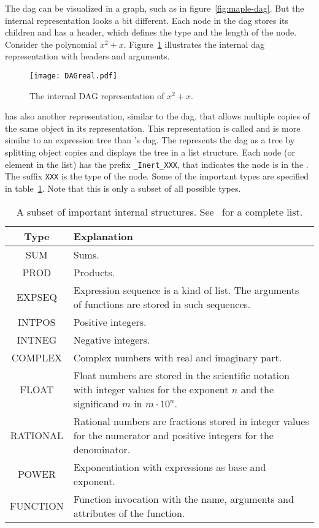 The \Maple{} \gls{dag} can be visualized in a graph, such as in figure~\ref{fig:maple-dag}. But the internal representation looks a bit different. Each node in the \gls{dag} stores its children and has a header, which defines the type and the length of the node. Consider the polynomial $x^2+x$. Figure~\ref{fig:internal-maple-dag} illustrates the internal \gls{dag} representation with headers and arguments.

\begin{figure}[ht]
	\centering
	\texttt{[image: DAGreal.pdf]}
	\caption{The internal \Maple{} DAG representation of $x^2+x$.}
	\label{fig:internal-maple-dag}
\end{figure}

\Maple{} has also another representation, similar to the \gls{dag}, that allows multiple copies of the same object in its representation. This representation is called \inertF{} and is more similar to an expression tree than \Maple's \gls{dag}. The \inertF{} represents the \gls{dag} as a tree by splitting object copies and displays the tree in a list structure. Each node (or element in the list) has the prefix \texttt{\_Inert\_XXX}, that indicates the node is in the \inertF. The suffix \texttt{XXX} is the type of the node. Some of the important types are specified in table~\ref{tab:maple-types}. Note that this is only a subset of all possible types.

\begin{table}[ht]
\centering
\begin{tabular}{cp{10cm}}
	\hline
	Type & Explanation\\
	\hline
	SUM & Sums.\\
	PROD & Products.\\
	EXPSEQ & Expression sequence is a kind of list. The arguments of functions are stored in such sequences.\\
	INTPOS & Positive integers.\\
	INTNEG & Negative integers.\\
	COMPLEX & Complex numbers with real and imaginary part.\\
	FLOAT & Float numbers are stored in the scientific notation with integer values for the exponent $n$ and the significand $m$ in $m \cdot 10^n$.\\
	RATIONAL & Rational numbers are fractions stored in integer values for the numerator and positive integers for the denominator.\\
	POWER & Exponentiation with expressions as base and exponent.\\
	FUNCTION & Function invocation with the name, arguments and attributes of the function.\\
	\hline
\end{tabular}
\caption{A subset of important internal \Maple{} structures. See~\cite{MAPLE:ProgrammingGuide} for a complete list.}
\label{tab:maple-types}
\end{table}

